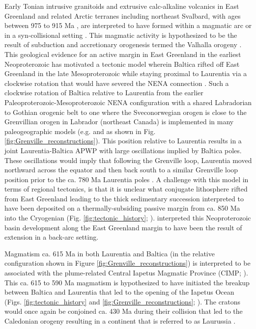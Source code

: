 \documentclass[twocolumn, switch]{article} %
\begin{document}
Early Tonian intrusive granitoids and extrusive calc-alkaline volcanics in East Greenland and related Arctic terranes including northeast Svalbard, with ages between 975 to 915 Ma \citep{McClelland2019a}, are interpreted to have formed within a magmatic arc or in a syn-collisional setting \citep{Johansson1999a}. This magmatic activity is hypothesized to be the result of subduction and accretionary orogenesis termed the Valhalla orogeny \citep{Cawood2010a}. This geological evidence for an active margin in East Greenland in the earliest Neoproterozoic has motivated a tectonic model wherein Baltica rifted off East Greenland in the late Mesoproterozoic while staying proximal to Laurentia via a clockwise rotation that would have severed the NENA connection \citep{Cawood2010a}. Such a clockwise rotation of Baltica relative to Laurentia from the earlier Paleoproterozoic-Mesoproterozoic NENA configuration with a shared Labradorian to Gothian orogenic belt to one where the Sveconorwegian orogen is close to the Grenvillian orogen in Labrador (northeast Canada) is implemented in many paleogeographic models (e.g. \citealp{Evans2009a} and as shown in Fig. \ref{fig:Grenville_reconstructions}). This position relative to Laurentia results in a joint Laurentia-Baltica APWP with large oscillations implied by Baltica poles. These oscillations would imply that following the Grenville loop, Laurentia moved northward across the equator and then back south to a similar Grenville loop position prior to the ca. 780 Ma Laurentia poles \citep{Evans2015a,Fairchild2017a}.  A challenge with this model in terms of regional tectonics, is that it is unclear what conjugate lithosphere rifted from East Greenland leading to the thick sedimentary succession interpreted to have been deposited on a thermally-subsiding passive margin from ca. 850 Ma into the Cryogenian (Fig. \ref{fig:tectonic_history}; \citealp{Maloof2006a}). \cite{Malone2014a} interpreted this Neoproterozoic basin development along the East Greenland margin to have been the result of extension in a back-arc setting. 

Magmatism ca. 615 Ma in both Laurentia and Baltica (in the relative configuration shown in Figure \ref{fig:Grenville_reconstructions}) is interpreted to be associated with the plume-related Central Iapetus Magmatic Province (CIMP; \citealp{Tegner2019a}). This ca. 615 to 590 Ma magmatism is hypothesized to have initiated the breakup between Baltica and Laurentia that led to the opening of the Iapetus Ocean (Figs. \ref{fig:tectonic_history} and \ref{fig:Grenville_reconstructions}; \citealp{Cawood2001a, Tegner2019a}). The cratons would once again be conjoined ca. 430 Ma during their collision that led to the Caledonian orogeny resulting in a continent that is referred to as Laurussia \citep{Torsvik2017a}.
\end{document}
